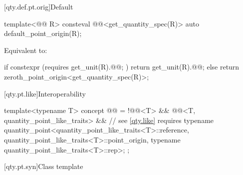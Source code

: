 [qty.def.pt.orig]{Default}

\begin{itemdecl}
template<@@ R>
consteval @@<get_quantity_spec(R{})> auto default_point_origin(R);
\end{itemdecl}

\begin{itemdescr}
\pnum
\effects
Equivalent to:
\begin{codeblock}
if constexpr (requires { get_unit(R{}).@@; })
  return get_unit(R{}).@@;
else
  return zeroth_point_origin<get_quantity_spec(R{})>;
\end{codeblock}
\end{itemdescr}

[qty.pt.like]{Interoperability}

\begin{itemdecl}
template<typename T>
concept @@ =
  !@@<T> &&
  @@<T, quantity_point_like_traits> &&  // see \ref{qty.like}
  requires {
    typename quantity_point<quantity_point_like_traits<T>::reference,
                            quantity_point_like_traits<T>::point_origin,
                            typename quantity_point_like_traits<T>::rep>;
  };
\end{itemdecl}

[qty.pt.syn]{Class template }

